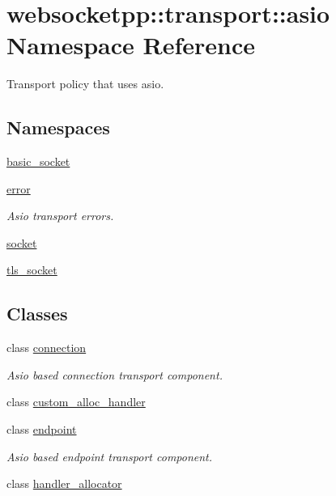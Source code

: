\hypertarget{namespacewebsocketpp_1_1transport_1_1asio}{}\section{websocketpp\+:\+:transport\+:\+:asio Namespace Reference}
\label{namespacewebsocketpp_1_1transport_1_1asio}


Transport policy that uses asio.  


\subsection*{Namespaces}
\begin{DoxyCompactItemize}
\item 
 \hyperlink{namespacewebsocketpp_1_1transport_1_1asio_1_1basic__socket}{basic\+\_\+socket}
\item 
 \hyperlink{namespacewebsocketpp_1_1transport_1_1asio_1_1error}{error}
\begin{DoxyCompactList}\small\item\em Asio transport errors. \end{DoxyCompactList}\item 
 \hyperlink{namespacewebsocketpp_1_1transport_1_1asio_1_1socket}{socket}
\item 
 \hyperlink{namespacewebsocketpp_1_1transport_1_1asio_1_1tls__socket}{tls\+\_\+socket}
\end{DoxyCompactItemize}
\subsection*{Classes}
\begin{DoxyCompactItemize}
\item 
class \hyperlink{classwebsocketpp_1_1transport_1_1asio_1_1connection}{connection}
\begin{DoxyCompactList}\small\item\em Asio based connection transport component. \end{DoxyCompactList}\item 
class \hyperlink{classwebsocketpp_1_1transport_1_1asio_1_1custom__alloc__handler}{custom\+\_\+alloc\+\_\+handler}
\item 
class \hyperlink{classwebsocketpp_1_1transport_1_1asio_1_1endpoint}{endpoint}
\begin{DoxyCompactList}\small\item\em Asio based endpoint transport component. \end{DoxyCompactList}\item 
class \hyperlink{classwebsocketpp_1_1transport_1_1asio_1_1handler__allocator}{handler\+\_\+allocator}
\end{DoxyCompactItemize}
